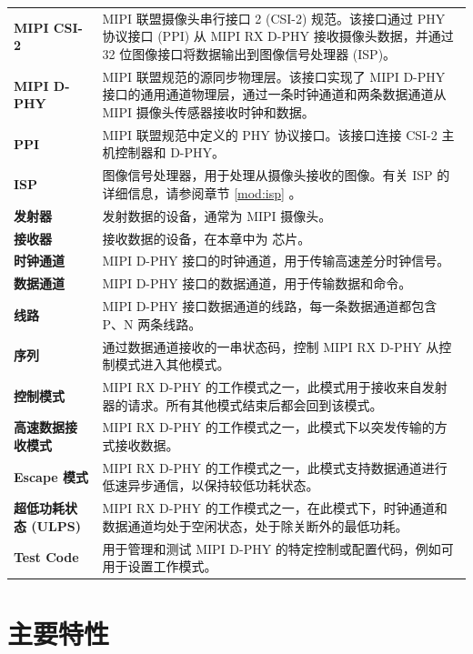 \documentclass[main\_\_CN.tex]{subfiles}
\begin{document}
\begin{longtable}[c]{ R{3cm} p{12cm} }
\textbf{MIPI CSI-2}& MIPI 联盟摄像头串行接口 2 (CSI-2) 规范。该接口通过 PHY 协议接口 (PPI) 从 MIPI RX D-PHY 接收摄像头数据，并通过 32 位图像接口将数据输出到图像信号处理器 (ISP)。\\
\textbf{MIPI D-PHY}& MIPI 联盟规范的源同步物理层。该接口实现了 MIPI D-PHY 接口的通用通道物理层，通过一条时钟通道和两条数据通道从 MIPI 摄像头传感器接收时钟和数据。\\
\textbf{PPI}& MIPI 联盟规范中定义的 PHY 协议接口。该接口连接 CSI-2 主机控制器和 D-PHY。\\
\textbf{ISP}& 图像信号处理器，用于处理从摄像头接收的图像。有关 ISP 的详细信息，请参阅章节 \ref{mod:isp} \textit{}。\\
\textbf{发射器}& 发射数据的设备，通常为 MIPI 摄像头。\\
\textbf{接收器}& 接收数据的设备，在本章中为 \chipname{} 芯片。\\
\textbf{时钟通道}& MIPI D-PHY 接口的时钟通道，用于传输高速差分时钟信号。\\
\textbf{数据通道}& MIPI D-PHY 接口的数据通道，用于传输数据和命令。\\
\textbf{线路}& MIPI D-PHY 接口数据通道的线路，每一条数据通道都包含 P、N 两条线路。\\
\textbf{序列} & 通过数据通道接收的一串状态码，控制 MIPI RX D-PHY 从控制模式进入其他模式。\\ 
\textbf{控制模式} & MIPI RX D-PHY 的工作模式之一，此模式用于接收来自发射器的请求。所有其他模式结束后都会回到该模式。\\
\textbf{高速数据接收模式} & MIPI RX D-PHY 的工作模式之一，此模式下以突发传输的方式接收数据。\\
\textbf{Escape 模式} & MIPI RX D-PHY 的工作模式之一，此模式支持数据通道进行低速异步通信，以保持较低功耗状态。\\
\textbf{超低功耗状态 (ULPS)} & MIPI RX D-PHY 的工作模式之一，在此模式下，时钟通道和数据通道均处于空闲状态，处于除关断外的最低功耗。\\
\textbf{Test Code} & 用于管理和测试 MIPI D-PHY 的特定控制或配置代码，例如可用于设置工作模式。\\
\end{longtable}



\section{主要特性}
\label{sec:mipicsi-features}
\end{document}
